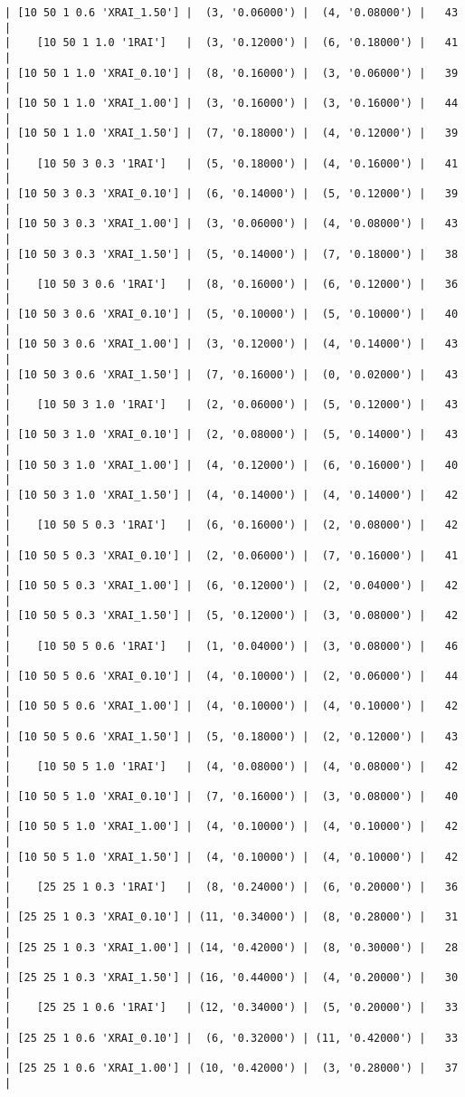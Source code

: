 \documentclass{article}
\begin{document}
\begin{verbatim}
| [10 50 1 0.6 'XRAI_1.50'] |  (3, '0.06000') |  (4, '0.08000') |   43  |
|    [10 50 1 1.0 '1RAI']   |  (3, '0.12000') |  (6, '0.18000') |   41  |
| [10 50 1 1.0 'XRAI_0.10'] |  (8, '0.16000') |  (3, '0.06000') |   39  |
| [10 50 1 1.0 'XRAI_1.00'] |  (3, '0.16000') |  (3, '0.16000') |   44  |
| [10 50 1 1.0 'XRAI_1.50'] |  (7, '0.18000') |  (4, '0.12000') |   39  |
|    [10 50 3 0.3 '1RAI']   |  (5, '0.18000') |  (4, '0.16000') |   41  |
| [10 50 3 0.3 'XRAI_0.10'] |  (6, '0.14000') |  (5, '0.12000') |   39  |
| [10 50 3 0.3 'XRAI_1.00'] |  (3, '0.06000') |  (4, '0.08000') |   43  |
| [10 50 3 0.3 'XRAI_1.50'] |  (5, '0.14000') |  (7, '0.18000') |   38  |
|    [10 50 3 0.6 '1RAI']   |  (8, '0.16000') |  (6, '0.12000') |   36  |
| [10 50 3 0.6 'XRAI_0.10'] |  (5, '0.10000') |  (5, '0.10000') |   40  |
| [10 50 3 0.6 'XRAI_1.00'] |  (3, '0.12000') |  (4, '0.14000') |   43  |
| [10 50 3 0.6 'XRAI_1.50'] |  (7, '0.16000') |  (0, '0.02000') |   43  |
|    [10 50 3 1.0 '1RAI']   |  (2, '0.06000') |  (5, '0.12000') |   43  |
| [10 50 3 1.0 'XRAI_0.10'] |  (2, '0.08000') |  (5, '0.14000') |   43  |
| [10 50 3 1.0 'XRAI_1.00'] |  (4, '0.12000') |  (6, '0.16000') |   40  |
| [10 50 3 1.0 'XRAI_1.50'] |  (4, '0.14000') |  (4, '0.14000') |   42  |
|    [10 50 5 0.3 '1RAI']   |  (6, '0.16000') |  (2, '0.08000') |   42  |
| [10 50 5 0.3 'XRAI_0.10'] |  (2, '0.06000') |  (7, '0.16000') |   41  |
| [10 50 5 0.3 'XRAI_1.00'] |  (6, '0.12000') |  (2, '0.04000') |   42  |
| [10 50 5 0.3 'XRAI_1.50'] |  (5, '0.12000') |  (3, '0.08000') |   42  |
|    [10 50 5 0.6 '1RAI']   |  (1, '0.04000') |  (3, '0.08000') |   46  |
| [10 50 5 0.6 'XRAI_0.10'] |  (4, '0.10000') |  (2, '0.06000') |   44  |
| [10 50 5 0.6 'XRAI_1.00'] |  (4, '0.10000') |  (4, '0.10000') |   42  |
| [10 50 5 0.6 'XRAI_1.50'] |  (5, '0.18000') |  (2, '0.12000') |   43  |
|    [10 50 5 1.0 '1RAI']   |  (4, '0.08000') |  (4, '0.08000') |   42  |
| [10 50 5 1.0 'XRAI_0.10'] |  (7, '0.16000') |  (3, '0.08000') |   40  |
| [10 50 5 1.0 'XRAI_1.00'] |  (4, '0.10000') |  (4, '0.10000') |   42  |
| [10 50 5 1.0 'XRAI_1.50'] |  (4, '0.10000') |  (4, '0.10000') |   42  |
|    [25 25 1 0.3 '1RAI']   |  (8, '0.24000') |  (6, '0.20000') |   36  |
| [25 25 1 0.3 'XRAI_0.10'] | (11, '0.34000') |  (8, '0.28000') |   31  |
| [25 25 1 0.3 'XRAI_1.00'] | (14, '0.42000') |  (8, '0.30000') |   28  |
| [25 25 1 0.3 'XRAI_1.50'] | (16, '0.44000') |  (4, '0.20000') |   30  |
|    [25 25 1 0.6 '1RAI']   | (12, '0.34000') |  (5, '0.20000') |   33  |
| [25 25 1 0.6 'XRAI_0.10'] |  (6, '0.32000') | (11, '0.42000') |   33  |
| [25 25 1 0.6 'XRAI_1.00'] | (10, '0.42000') |  (3, '0.28000') |   37  |

\end{verbatim}
\end{document}
